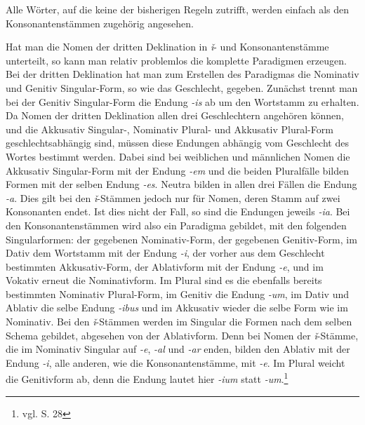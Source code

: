Alle Wörter, auf die keine der bisherigen Regeln zutrifft, werden einfach als den Konsonantenstämmen zugehörig angesehen. \par
Hat man die Nomen der dritten Deklination in \textit{ǐ}- und Konsonantenstämme unterteilt, so kann man relativ problemlos die komplette Paradigmen erzeugen. Bei der dritten Deklination hat man zum Erstellen des Paradigmas die Nominativ und Genitiv Singular-Form, so wie das Geschlecht, gegeben. Zunächst trennt man bei der Genitiv Singular-Form die Endung \textit{-is} ab um den Wortstamm zu erhalten. Da Nomen der dritten Deklination allen drei Geschlechtern angehören können, und die Akkusativ Singular-, Nominativ Plural- und Akkusativ Plural-Form geschlechtsabhängig sind, müssen diese Endungen abhängig vom Geschlecht des Wortes bestimmt werden. Dabei sind bei weiblichen und männlichen Nomen die Akkusativ Singular-Form mit der Endung \textit{-em} und die beiden Pluralfälle bilden Formen mit der selben Endung \textit{-es}. Neutra bilden in allen drei Fällen die Endung \textit{-a}. Dies gilt bei den \textit{ǐ}-Stämmen jedoch nur für Nomen, deren Stamm auf zwei Konsonanten endet. Ist dies nicht der Fall, so sind die Endungen jeweils \textit{-ia}. Bei den Konsonantenstämmen wird also ein Paradigma gebildet, mit den folgenden Singularformen: der gegebenen Nominativ-Form, der gegebenen Genitiv-Form, im Dativ dem Wortstamm mit der Endung \textit{-i}, der vorher aus dem Geschlecht bestimmten Akkusativ-Form, der Ablativform mit der Endung \textit{-e}, und im Vokativ erneut die Nominativform. Im Plural sind es die ebenfalls bereits bestimmten Nominativ Plural-Form, im Genitiv die Endung \textit{-um}, im Dativ und Ablativ die selbe Endung \textit{-ibus} und im Akkusativ wieder die selbe Form wie im Nominativ. Bei den \textit{ǐ}-Stämmen werden im Singular die Formen nach dem selben Schema gebildet, abgesehen von der Ablativform. Denn bei Nomen der \textit{ǐ}-Stämme, die im Nominativ Singular auf \textit{-e}, \textit{-al} und \textit{-ar} enden, bilden den Ablativ mit der Endung \textit{-i}, alle anderen, wie die Konsonantenstämme, mit \textit{-e}. Im Plural weicht die Genitivform ab, denn die Endung lautet hier \textit{-ium} statt \textit{-um}.\footnote{vgl. \cite{BAYER-LINDAUER1994} S. 28} \par
